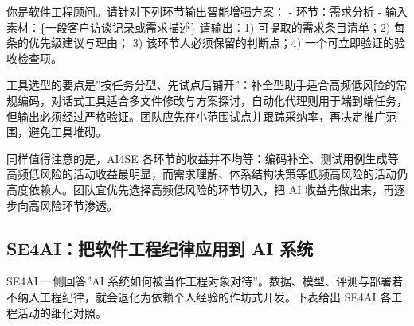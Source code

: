 \documentclass[
]{ctexbook}
\newenvironment{Shaded}{
  \ttfamily\small
}{}
\newcommand{\NormalTok}[1]{#1}
\begin{document}
\begin{Shaded}
\begin{Highlighting}[]
\NormalTok{你是软件工程顾问。请针对下列环节输出智能增强方案：}
\NormalTok{{-} 环节：需求分析}
\NormalTok{{-} 输入素材：\{一段客户访谈记录或需求描述\}}
\NormalTok{请输出：1) 可提取的需求条目清单；2) 每条的优先级建议与理由；}
\NormalTok{3) 该环节人必须保留的判断点；4) 一个可立即验证的验收检查项。}
\end{Highlighting}
\end{Shaded}

工具选型的要点是''按任务分型、先试点后铺开''：补全型助手适合高频低风险的常规编码，对话式工具适合多文件修改与方案探讨，自动化代理则用于端到端任务，但输出必须经过严格验证。团队应先在小范围试点并跟踪采纳率，再决定推广范围，避免工具堆砌。

同样值得注意的是，AI4SE
各环节的收益并不均等：编码补全、测试用例生成等高频低风险的活动收益最明显，而需求理解、体系结构决策等低频高风险的活动仍高度依赖人。团队宜优先选择高频低风险的环节切入，把
AI 收益先做出来，再逐步向高风险环节渗透。

\subsection{SE4AI：把软件工程纪律应用到 AI
系统}\label{se4aiux628aux8f6fux4ef6ux5de5ux7a0bux7eaaux5f8bux5e94ux7528ux5230-ai-ux7cfbux7edf}

SE4AI 一侧回答''AI
系统如何被当作工程对象对待''。数据、模型、评测与部署若不纳入工程纪律，就会退化为依赖个人经验的作坊式开发。下表给出
SE4AI 各工程活动的细化对照。
\end{document}
